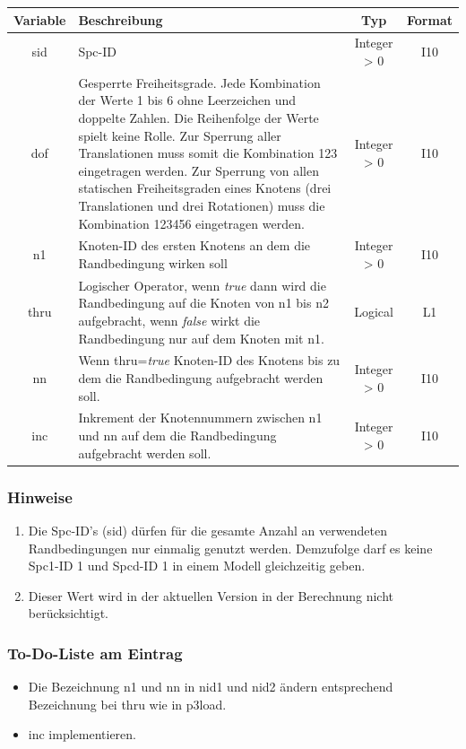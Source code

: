 \documentclass[11pt,titlepage,listof=totoc,bibliography=totoc,twoside]{scrreprt}
\begin{document}
{{\begin{tabularx}{\textwidth}{cXcc}
\toprule
Variable& Beschreibung												& Typ		& Format\\
\midrule
sid	& Spc-ID												& Integer > 0	& I10	\\
dof	& Gesperrte Freiheitsgrade. Jede Kombination der Werte 1 bis 6 ohne Leerzeichen und doppelte Zahlen. Die Reihenfolge der Werte spielt keine Rolle. Zur Sperrung aller Translationen muss somit die Kombination 123 eingetragen werden. Zur Sperrung von allen statischen Freiheitsgraden eines Knotens (drei Translationen und drei Rotationen) muss die Kombination 123456 eingetragen werden.														& Integer > 0	& I10	\\
n1	& Knoten-ID des ersten Knotens an dem die Randbedingung wirken soll					& Integer > 0	& I10	\\
thru	& Logischer Operator, wenn \emph{true} dann wird die Randbedingung auf die Knoten von n1 bis n2 aufgebracht, wenn \emph{false} wirkt die Randbedingung nur auf dem Knoten mit n1.																& Logical	& L1	\\
nn	& Wenn thru=\emph{true} Knoten-ID des Knotens bis zu dem die Randbedingung aufgebracht werden soll.	& Integer > 0	& I10	\\
inc	& Inkrement der Knotennummern zwischen n1 und nn auf dem die Randbedingung aufgebracht werden soll.	& Integer > 0	& I10	\\
\bottomrule
\end{tabularx}

\subsubsection{Hinweise}

\begin{enumerate}
\item Die Spc-ID's (sid) dürfen für die gesamte Anzahl an verwendeten Randbedingungen nur einmalig genutzt werden. Demzufolge darf es keine Spc1-ID 1 und Spcd-ID 1 in einem Modell gleichzeitig geben.
\item Dieser Wert wird in der aktuellen Version in der Berechnung nicht berücksichtigt.
\end{enumerate}

\subsubsection{To-Do-Liste am Eintrag}

\begin{itemize}
\item Die Bezeichnung n1 und nn in nid1 und nid2 ändern entsprechend Bezeichnung bei thru wie in p3load.
\item inc implementieren.
\end{itemize}

}}
\end{document}
